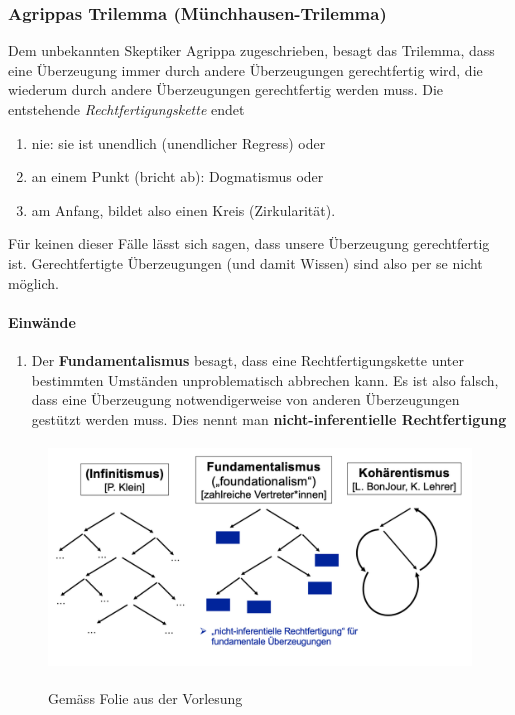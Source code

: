 \documentclass[../main.tex]{subfiles}
\begin{document}
\subsubsection{Agrippas Trilemma (Münchhausen-Trilemma)}
Dem unbekannten Skeptiker Agrippa zugeschrieben, besagt das Trilemma, dass eine Überzeugung immer durch andere Überzeugungen gerechtfertig wird, die wiederum durch andere Überzeugungen gerechtfertig werden muss. Die entstehende \textit{Rechtfertigungskette} endet 
\begin{enumerate}
	\item nie: sie ist unendlich (unendlicher Regress) oder 
	\item an einem Punkt (bricht ab): Dogmatismus oder
	\item am Anfang, bildet also einen Kreis (Zirkularität).
\end{enumerate}
Für keinen dieser Fälle lässt sich sagen, dass unsere Überzeugung gerechtfertig ist. Gerechtfertigte Überzeugungen (und damit Wissen) sind also per se nicht möglich. 
\paragraph{Einwände}
\begin{enumerate}
	\item Der \textbf{Fundamentalismus} besagt, dass eine Rechtfertigungskette unter bestimmten Umständen unproblematisch abbrechen kann. Es ist also falsch, dass eine Überzeugung notwendigerweise von anderen Überzeugungen gestützt werden muss. Dies nennt man \textbf{nicht-inferentielle Rechtfertigung}
\end{enumerate}


\begin{figure}[!htb]
\centering
{\centering\includegraphics[height=6cm]{images/argumentationsketten.png}\endcenter}
\caption{Gemäss Folie aus der Vorlesung}
\end{figure}
\end{document}
